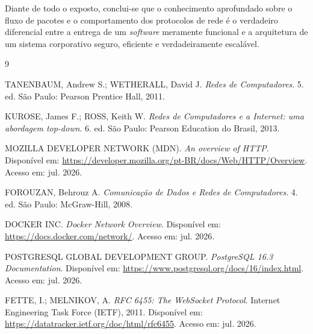 \documentclass[12pt, a4paper]{article}
\begin{document}
Diante de todo o exposto, conclui-se que o conhecimento aprofundado sobre o fluxo de pacotes e o comportamento dos protocolos de rede é o verdadeiro diferencial entre a entrega de um \textit{software} meramente funcional e a arquitetura de um sistema corporativo seguro, eficiente e verdadeiramente escalável.

\begin{thebibliography}{9}

    TANENBAUM, Andrew S.; WETHERALL, David J. 
    \textit{Redes de Computadores}. 5. ed. São Paulo: Pearson Prentice Hall, 2011.

    KUROSE, James F.; ROSS, Keith W. 
    \textit{Redes de Computadores e a Internet: uma abordagem top-down}. 6. ed. São Paulo: Pearson Education do Brasil, 2013.
    
    MOZILLA DEVELOPER NETWORK (MDN). 
    \textit{An overview of HTTP}. Disponível em: \url{https://developer.mozilla.org/pt-BR/docs/Web/HTTP/Overview}. Acesso em: jul. 2026.

    FOROUZAN, Behrouz A. 
    \textit{Comunicação de Dados e Redes de Computadores}. 4. ed. São Paulo: McGraw-Hill, 2008.

    DOCKER INC. 
    \textit{Docker Network Overview}. Disponível em: \url{https://docs.docker.com/network/}. Acesso em: jul. 2026.

    POSTGRESQL GLOBAL DEVELOPMENT GROUP. 
    \textit{PostgreSQL 16.3 Documentation}. Disponível em: \url{https://www.postgresql.org/docs/16/index.html}. Acesso em: jul. 2026.

    FETTE, I.; MELNIKOV, A. 
    \textit{RFC 6455: The WebSocket Protocol}. Internet Engineering Task Force (IETF), 2011. Disponível em: \url{https://datatracker.ietf.org/doc/html/rfc6455}. Acesso em: jul. 2026.

\end{thebibliography}
\end{document}
